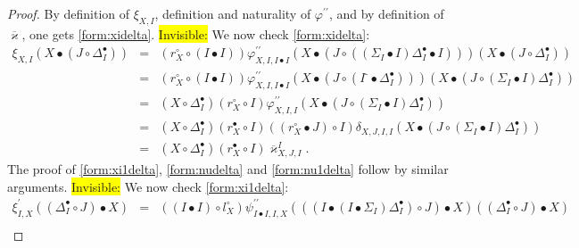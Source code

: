 \documentclass[nosumlimits,twoside]{amsart}
\theoremstyle{definition}
\theoremstyle{remark}
\def\revsn{\text{-}}
\newenvironment{invisible}{{\noindent\sc \colorbox{yellow}{Invisible:}\;}\color{gray}}{\medskip}
\begin{document}
\begin{proof}
By definition of $\xi _{X,I}$, definition and naturality of $\varphi^{\prime \prime }$, and by definition of $\overline{\varkappa }$, one gets \eqref{form:xidelta}.
\begin{invisible}
We now check \eqref{form:xidelta}:
\begin{eqnarray*}
\xi _{X,I}\left( X\bullet \left( J\circ \Delta _{I}^{\bullet }\right)
\right)  &=&\left( r_{X}^{\circ }\circ \left( I\bullet I\right) \right) \varphi
_{X,I,I\bullet I}^{\prime \prime }\left( X\bullet \left( J\circ \left(
\left( \Sigma _{I}\bullet I\right) \Delta _{I}^{\bullet }\bullet I\right)
\right) \right) \left( X\bullet \left( J\circ \Delta _{I}^{\bullet }\right)
\right)  \\
&=&\left( r_{X}^{\circ }\circ \left( I\bullet I\right) \right) \varphi
_{X,I,I\bullet I}^{\prime \prime }\left( X\bullet \left( J\circ \left(
I^\revsn\bullet \Delta _{I}^{\bullet }\right) \right) \right) \left( X\bullet
\left( J\circ \left( \Sigma _{I}\bullet I\right) \Delta _{I}^{\bullet
}\right) \right)  \\
&=&\left( X\circ \Delta _{I}^{\bullet }\right) \left( r_{X}^{\circ }\circ
I\right) \varphi _{X,I,I}^{\prime \prime }\left( X\bullet \left( J\circ
\left( \Sigma _{I}\bullet I\right) \Delta _{I}^{\bullet }\right) \right)  \\
&=&\left( X\circ \Delta _{I}^{\bullet }\right) \left( r_{X}^{\bullet }\circ
I\right) \left( \left( r_{X}^{\circ }\bullet J\right) \circ I\right) \delta
_{X,J,I,I}\left( X\bullet \left( J\circ \left( \Sigma _{I}\bullet I\right)
\Delta _{I}^{\bullet }\right) \right)  \\
&=&\left( X\circ \Delta _{I}^{\bullet }\right) \left( r_{X}^{\bullet }\circ
I\right) \overline{\varkappa }_{X,J,I}^{I}.
\end{eqnarray*}%
\end{invisible}
The proof of \eqref{form:xi1delta}, \eqref{form:nudelta} and \eqref{form:nu1delta} follow by similar arguments.
\begin{invisible}
We now check \eqref{form:xi1delta}:
\begin{eqnarray*}
\xi _{I,X}^{\prime }\left( \left( \Delta _{I}^{\bullet }\circ J\right)
\bullet X\right)  &=&\left( \left( I\bullet I\right) \circ l_{X}^{\circ
}\right) \psi _{I\bullet I,I,X}^{\prime \prime }\left( \left( \left(
I\bullet \left( I\bullet \Sigma _{I}\right) \Delta _{I}^{\bullet }\right)
\circ J\right) \bullet X\right) \left( \left( \Delta _{I}^{\bullet }\circ
J\right) \bullet X\right)  \\

\end{eqnarray*}
\end{invisible}
\end{proof}
\end{document}
